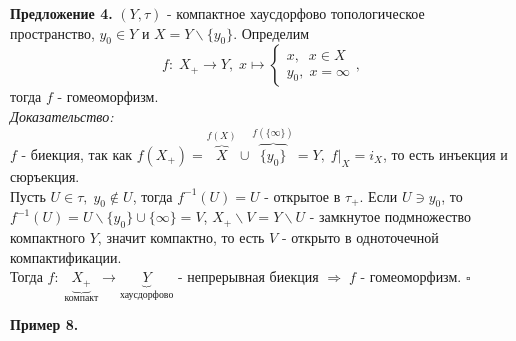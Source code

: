 \documentclass[../../main.tex]{subfiles}
\begin{document}
\textbf{Предложение 4.} $(Y,\tau)$ - компактное хаусдорфово топологическое пространство, $y_0\in Y$ и $X=Y\backslash\{y_0\}$. Определим \\
\begin{equation*}
    f:\;X_+\rightarrow Y,\; x\mapsto \left \{ \begin{gathered}
    x , \;\;x\in X\\
    y_0 , \;x = \infty
    \end{gathered} \right .,
\end{equation*}
тогда $f$ - гомеоморфизм.\\
\textit{Доказательство:}\\
$f$ - биекция, так как $f(X_+) = \overbrace{X}^{f(X)}\cup \overbrace{\{y_0\}}^{f(\{\infty\})} = Y,\; f|_X = i_X$, то есть инъекция и сюръекция.\\
Пусть $U\in \tau,\; y_0\notin U$, тогда $f^{-1}(U) = U$ - открытое в $\tau_+$. Если $U\ni y_0$, то $f^{-1}(U) = U\backslash \{y_0\}\cup \{\infty\} = V$, $X_+\backslash V = Y\backslash U$ - замкнутое подмножество компактного $Y$, значит компактно, то есть $V$ - открыто в одноточечной компактификации.\\
Тогда $f:\;\underbrace{X_+}_{\text{компакт}}\rightarrow \underbrace{Y}_{\text{хаусдорфово}}$ - непрерывная биекция $\Rightarrow\; f$ - гомеоморфизм. $\square$ 

\textbf{Пример 8.} 
\end{document}
